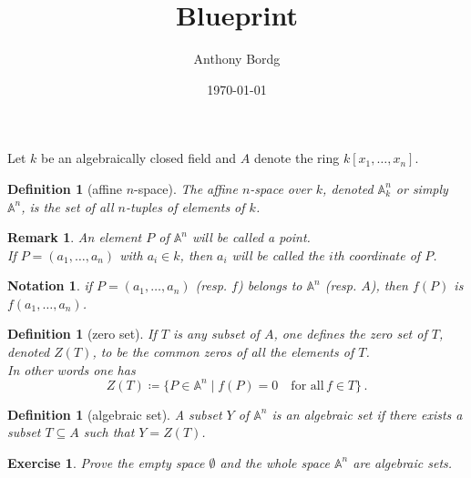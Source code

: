 \documentclass[12pt]{article}
\newtheorem{definition}[proposition]{Definition}
\newtheorem{remark}[proposition]{Remark}
\newtheorem{ex}[proposition]{Exercise}
\newtheorem{notation}{Notation}
\begin{document}
\title{Blueprint}	
\author{Anthony Bordg}
\date{\today}
\maketitle

\begin{abstract}
\end{abstract}
	
Let $k$ be an algebraically closed field and $A$ denote the ring $k \left[ x_1, \dots, x_n \right]$. \\

\begin{definition}[affine $n$-space] 
	The affine $n$-space over $k$, denoted $\mathbb{A}^n_k$ or simply $\mathbb{A}^n$, is the set of all $n$-tuples of elements of $k$.  
\end{definition}

\begin{remark}
	An element $P$ of $\mathbb{A}^n$ will be called a point. \\
	If $P = (a_1, \dots, a_n)$ with $a_i \in k$, then $a_i$ will be called the $i$th coordinate of $P$.
\end{remark}

\begin{notation}
	if $P = (a_1, \dots, a_n)$ (\textit{resp.} $f$) belongs to $\mathbb{A}^n$ (\textit{resp.} $A$), then $f(P)$ is $f(a_1, \dots, a_n)$.
\end{notation}		

\begin{definition}[zero set]
	If $T$ is any subset of $A$, one defines the zero set of $T$, denoted $Z(T)$, to be the common zeros of all the elements of $T$. \\
	In other words one has
	\[
	Z(T) \coloneqq \lbrace P \in \mathbb{A}^n \mid f(P) = 0 \quad \text{for all}\, f \in T \rbrace \, . 
	\]
\end{definition}

\begin{definition}[algebraic set]
	A subset $Y$ of $\mathbb{A}^n$ is an algebraic set if there exists a subset $T \subseteq A$ such that $Y = Z(T)$. 
\end{definition}

\begin{ex}
	Prove the empty space $\emptyset$ and the whole space $\mathbb{A}^n$ are algebraic sets.
\end{ex}
\end{document}
